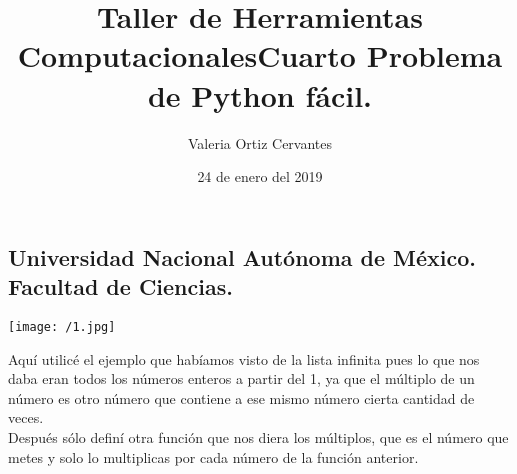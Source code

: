 \documentclass{article} %
\title{\Huge Taller de Herramientas Computacionales}
\author{\huge Valeria Ortiz Cervantes}
\date{\LARGE 24 de enero del 2019}
\begin{document}
\maketitle
\begin{center}
	\subsection*{\LARGE Universidad Nacional Autónoma de México.\\Facultad de Ciencias.\\}
	\texttt{[image: /1.jpg]}
\end{center}
\newpage
\title{\LARGE Cuarto Problema de Python fácil.\\}
Aquí utilicé el ejemplo que habíamos visto de la lista infinita pues lo que nos daba eran todos los números enteros  a partir del 1, ya que el múltiplo de un número es otro número que contiene a ese mismo número cierta cantidad de veces.\\
Después sólo definí otra función que nos diera los múltiplos, que es el número que metes y solo lo multiplicas por cada número de la función anterior.
\end{document}
